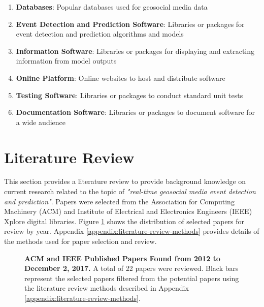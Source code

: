\begin{enumerate}
	\item \textbf{Databases}: Popular databases used for geosocial media data
	\item \textbf{Event Detection and Prediction Software}: Libraries or packages for event detection and prediction algorithms and models
	\item \textbf{Information Software}: Libraries or packages for displaying and extracting information from model outputs
	\item \textbf{Online Platform}: Online websites to host and distribute software
	\item \textbf{Testing Software}: Libraries or packages to conduct standard unit tests
	\item \textbf{Documentation Software}: Libraries or packages to document software for a wide audience
\end{enumerate}




\section{Literature Review} \label{literature-review}

This section provides a literature review to provide background knowledge on current research related to the topic of \textit{"real-time geosocial media event detection and prediction"}. Papers were selected from the Association for Computing Machinery (ACM) and Institute of Electrical and Electronics Engineers (IEEE) Xplore digital libraries. Figure \ref{figure:papers_yearly} shows  the distribution of selected papers for review by year. Appendix \ref{appendix:literature-review-methods} provides details of the methods used for paper selection and review.

\begin{figure}[!htb]
\begin{center}
\caption{\textbf{ACM and IEEE Published Papers Found from 2012 to December 2, 2017.} A total of 22 papers were reviewed. Black bars represent the selected papers filtered from the potential papers using the literature review methods described in Appendix \ref{appendix:literature-review-methods}.}
\label{figure:papers_yearly}
\end{center}
\end{figure}

